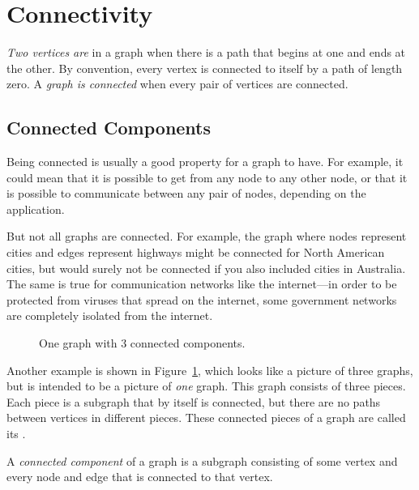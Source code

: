 \section{Connectivity}\label{connect-sec}

\begin{definition}\label{def:connected-vertices} %
  \emph{Two vertices are}  in a graph when there is a
  path that begins at one and ends at the other.  By convention, every
  vertex is connected to itself by a path of length zero.  A
  \emph{graph is connected} when every pair of vertices are connected.
\end{definition}

\subsection{Connected Components}

Being connected is usually a good property for a graph to have.  For
example, it could mean that it is possible to get from any node to any
other node, or that it is possible to communicate between any pair of
nodes, depending on the application.

But not all graphs are connected.  For example, the graph where nodes
represent cities and edges represent highways might be connected for
North American cities, but would surely not be connected if you also
included cities in Australia.  The same is true for communication
networks like the internet---in order to be protected from viruses
that spread on the internet, some government networks are completely
isolated from the internet.

\begin{figure}[htbp]
\caption{One graph with 3 connected components.}
\label{fig:3comp}
\end{figure}

Another example is shown in Figure~\ref{fig:3comp}, which looks like a
picture of three graphs, but is intended to be a picture of \emph{one}
graph.  This graph consists of three pieces.  Each piece is a subgraph
that by itself is connected, but there are no paths between vertices
in different pieces.  These connected pieces of a graph are called its
.

\begin{definition}\label{def:connected-component}
A \emph{connected component} of a graph is a subgraph consisting of
some vertex and every node and edge that is connected to that vertex.
\end{definition}

